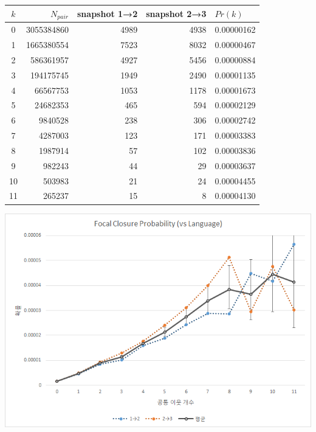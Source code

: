 \documentclass[10pt, a4paper, titlepage]{article}
\begin{document}
\begin{longtable}{|c|r|r|r|l|}

\hline
\rowcolor[gray]{0.8}
$k$ & 
$N_{pair}$ & 
snapshot 1→2 &
snapshot 2→3 & 
$Pr(k)$ \\ \hline


0 &
3055384860 &
4989 &
4938 &
0.00000162 \\ \hline 
1 &
1665380554 &
7523 &
8032 &
0.00000467 \\ \hline 
2 &
586361957 &
4927 &
5456 &
0.00000884 \\ \hline 
3 &
194175745 &
1949 &
2490 &
0.00001135 \\ \hline 
4 &
66567753 &
1053 &
1178 &
0.00001673 \\ \hline 
5 &
24682353 &
465 &
594 &
0.00002129 \\ \hline 
6 &
9840528 &
238 &
306 &
0.00002742 \\ \hline 
7 &
4287003 &
123 &
171 &
0.00003383 \\ \hline 
8 &
1987914 &
57 &
102 &
0.00003836 \\ \hline 
9 &
982243 &
44 &
29 &
0.00003637 \\ \hline 
10 &
503983 &
21 &
24 &
0.00004455 \\ \hline 
11 &
265237 &
15 &
8 &
0.00004130 \\ \hline 

\end{longtable}

\begin{center}
\includegraphics[width=\textwidth]{image16}
\label{fig:focallang}
\end{center}
\end{document}
